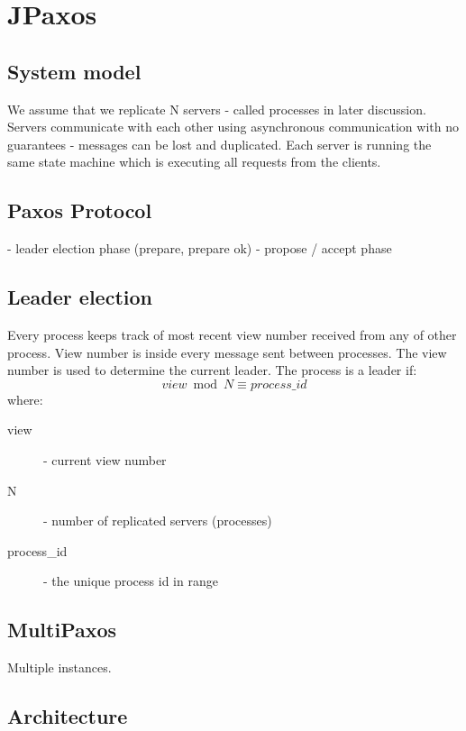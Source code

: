 
\chapter{JPaxos}

\section{System model}

We assume that we replicate N servers - called processes in later discussion.
Servers communicate with each other using asynchronous communication with no
guarantees - messages can be lost and duplicated. Each server is running the
same state machine which is executing all requests from the clients.

\section{Paxos Protocol}

- leader election phase (prepare, prepare ok)
- propose / accept phase

\section{Leader election}

Every process keeps track of most recent view number received from any of other
process. View number is inside every message sent between processes. The view
number is used to determine the current leader. The process is a leader if: 
$$ view \bmod N \equiv process\_id $$
where:

\begin{description}
  \item[view] - current view number
  \item[N] - number of replicated servers (processes)
  \item[process\_id] - the unique process id in range 
\end{description}

\section{MultiPaxos}

Multiple instances.

\section{Architecture}

